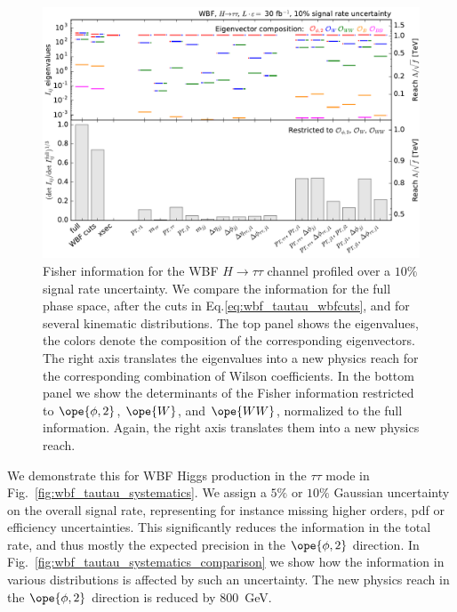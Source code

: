 \begin{figure}
  \centering
  \includegraphics[height=0.6 \textwidth]{fig/information/wbf_tautau_histos_comparison_systematics.pdf}
  \caption{Fisher information for the WBF $H \to \tau \tau$ channel
    profiled over a $10\%$ signal rate uncertainty. We compare the
    information for the full phase space, after the cuts in
    Eq.\;\eqref{eq:wbf_tautau_wbfcuts}, and for several kinematic
    distributions.  The top panel shows the eigenvalues, the colors
    denote the composition of the corresponding eigenvectors. The
    right axis translates the eigenvalues into a new physics reach for
    the corresponding combination of Wilson coefficients.  In the
    bottom panel we show the determinants of the Fisher information
    restricted to $\ope{\phi,2}$, $\ope{W}$, and $\ope{WW}$,
    normalized to the full information. Again, the right axis
    translates them into a new physics reach.}
  \label{fig:information_wbf_tautau_systematics_comparison}
\end{figure}

We demonstrate this for WBF Higgs production in the $\tau \tau$ mode
in Fig.~\ref{fig:wbf_tautau_systematics}. We assign a $5\%$ or $10\%$
Gaussian uncertainty on the overall signal rate, representing for
instance missing higher orders, pdf or efficiency uncertainties. This
significantly reduces the information in the total rate, and thus
mostly the expected precision in the $\ope{\phi,2}$ direction.  In
Fig.~\ref{fig:wbf_tautau_systematics_comparison} we show how the
information in various distributions is affected by such an
uncertainty. The new physics reach in the $\ope{\phi,2}$ direction is
reduced by 800~GeV. 




